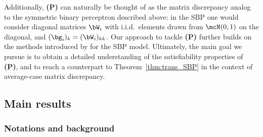 \myskip 
Additionally, \textbf{(P)} can naturally be thought of as the matrix discrepancy analog to the symmetric binary perceptron 
described above:
in the SBP one would consider
diagonal matrices $\bW_i$ with i.i.d.\ elements drawn from $\mcN(0,1)$ on the diagonal, 
and $(\bg_i)_k = (\bW_{i})_{kk}$.
Our approach to tackle \textbf{(P)} further builds on the methods introduced by \cite{aubin2019storage} for the SBP model.
Ultimately, the main goal we pursue is to obtain a detailed understanding of the satisfiability properties of \textbf{(P)}, 
and to reach a counterpart to Theorem~\ref{thm:trans_SBP} in the context of average-case matrix discrepancy.

\subsection{Main results}

\subsubsection*{Notations and background}

